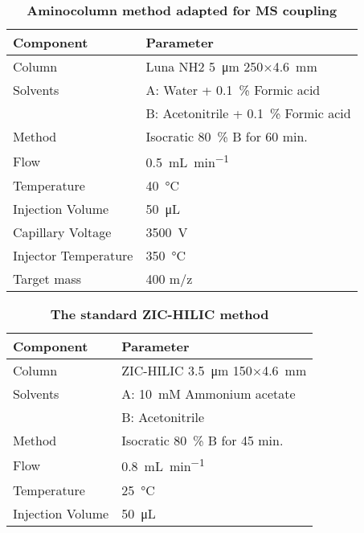 	\begin{table}[htbp]
		\caption[Aminocolumn method adapted for MS coupling]{\textbf{Aminocolumn method adapted for MS coupling}}
		\label{tab:method_nh2_ms}
		\centering
		\begin{tabularx}{\textwidth}{XX}
			\toprule
			\textbf{Component}	& \textbf{Parameter}	\\
			\midrule
			Column 		& Luna NH2 \SI{5}{\micro\meter} 250$\times$\SI{4.6}{\milli\meter} 	\\
			Solvents	& A: Water + 0.1~\% Formic acid 	\\
						& B: Acetonitrile + 0.1~\% Formic acid		\\
			Method 		& Isocratic 80~\% B for 60 min. 	\\
			Flow 		& \SI{0.5}{\milli\liter\per\minute} \\
			Temperature & \SI{40}{\celsius} 	\\
			Injection Volume 	& \SI{50}{\micro\liter} 	\\
			\midrule
			Capillary Voltage 		& \SI{3500}{\volt} 	\\
			Injector Temperature	& \SI{350}{\celsius}\\
			Target mass 			& 400 m/z 			\\
			\bottomrule
		\end{tabularx}
	\end{table}

	\begin{table}[htbp]
		\caption[The standard ZIC-HILIC method]{\textbf{The standard ZIC-HILIC method}}
		\label{tab:method_hilic_standard}
		\centering
		\begin{tabularx}{\textwidth}{XX}
			\toprule
			\textbf{Component}	& \textbf{Parameter}	\\
			\midrule
			Column 		& ZIC-HILIC \SI{3.5}{\micro\meter} 150$\times$\SI{4.6}{\milli\meter} 	\\
			Solvents	& A: 	10~mM Ammonium acetate 	\\
						& B: 	Acetonitrile 			\\
			Method 		& Isocratic 80~\% B for 45 min. 	\\
			Flow 		& \SI{0.8}{\milli\liter\per\minute} \\
			Temperature & \SI{25}{\celsius} 	\\
			Injection Volume 	& \SI{50}{\micro\liter} 	\\
			\bottomrule
		\end{tabularx}
	\end{table}

